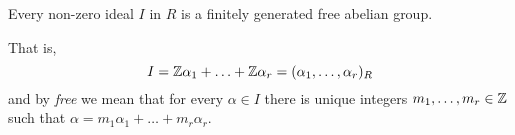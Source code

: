 \begin{theorem}[]
	Every non-zero ideal $I$ in $R$ is a finitely generated free abelian group.
\end{theorem}

That is, 
\[
	I 
	= \mathbb{Z} \alpha_1 + \ldots + \mathbb{Z} \alpha_r
	= (\alpha_1, \ldots, \alpha_r)_R
\]
and by \emph{free} we mean that for every $\alpha \in I$
there is unique integers $m_1, \ldots, m_r \in \mathbb{Z}$
such that
$\alpha = m_1 \alpha_1 + \ldots + m_r \alpha_r$.

